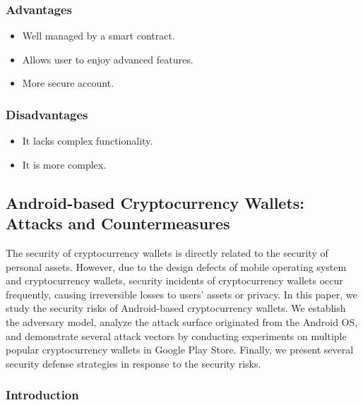\documentclass[12pt]{article}
\begin{document}
\newpage
\subsubsection{Advantages}
\begin{itemize}
\item Well managed by a smart contract.
\item Allows user to enjoy advanced features.
\item More secure account.


\end{itemize}
\vspace{10px}
\par \subsubsection{Disadvantages}
\begin{itemize}
\item It lacks complex functionality.
\item It is more complex.

\end{itemize}
\vspace{10px}
\newpage

\subsection{Android-based Cryptocurrency Wallets: Attacks and
Countermeasures}
\vspace*{10px}

  The security of cryptocurrency wallets is directly
related to the security of personal assets. However, due to the
design defects of mobile operating system and cryptocurrency
wallets, security incidents of cryptocurrency wallets occur frequently, causing irreversible losses to users’ assets or privacy.
In this paper, we study the security risks of Android-based
cryptocurrency wallets. We establish the adversary model,
analyze the attack surface originated from the Android OS, and
demonstrate several attack vectors by conducting experiments
on multiple popular cryptocurrency wallets in Google Play
Store. Finally, we present several security defense strategies in
response to the security risks.

\subsubsection{Introduction}
\end{document}
